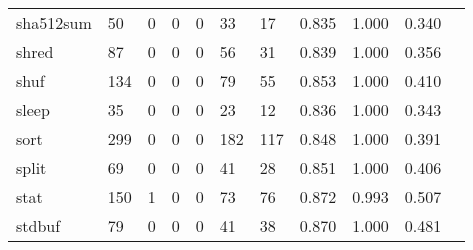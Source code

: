 \begin{longtable}{lp{1.10cm}p{1.10cm}p{1.10cm}p{1.10cm}p{1.10cm}p{1.10cm}p{1.10cm}p{1.10cm}p{1.10cm}p{1.10cm}}
sha512sum &                     50 &                                  0 &                                 0 &                                0 &                                33 &                              17 &                          0.835 &                                 1.000 &                               0.340 \\
shred     &                     87 &                                  0 &                                 0 &                                0 &                                56 &                              31 &                          0.839 &                                 1.000 &                               0.356 \\
shuf      &                    134 &                                  0 &                                 0 &                                0 &                                79 &                              55 &                          0.853 &                                 1.000 &                               0.410 \\
sleep     &                     35 &                                  0 &                                 0 &                                0 &                                23 &                              12 &                          0.836 &                                 1.000 &                               0.343 \\
sort      &                    299 &                                  0 &                                 0 &                                0 &                               182 &                             117 &                          0.848 &                                 1.000 &                               0.391 \\
split     &                     69 &                                  0 &                                 0 &                                0 &                                41 &                              28 &                          0.851 &                                 1.000 &                               0.406 \\
stat      &                    150 &                                  1 &                                 0 &                                0 &                                73 &                              76 &                          0.872 &                                 0.993 &                               0.507 \\
stdbuf    &                     79 &                                  0 &                                 0 &                                0 &                                41 &                              38 &                          0.870 &                                 1.000 &                               0.481 \\

\end{longtable}
